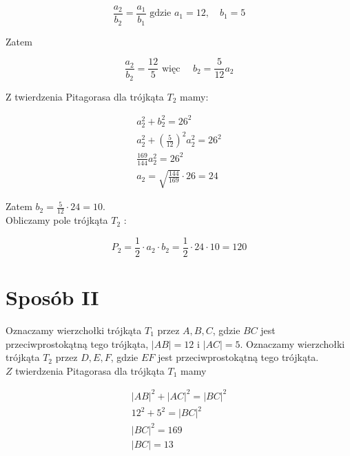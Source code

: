 \documentclass[10pt]{article}
\begin{document}
$$
\frac{a_{2}}{b_{2}}=\frac{a_{1}}{b_{1}} \text { gdzie } a_{1}=12, \quad b_{1}=5
$$

Zatem

$$
\frac{a_{2}}{b_{2}}=\frac{12}{5} \text { więc } \quad b_{2}=\frac{5}{12} a_{2}
$$

Z twierdzenia Pitagorasa dla trójkąta $T_{2}$ mamy:

$$
\begin{gathered}
a_{2}^{2}+b_{2}^{2}=26^{2} \\
a_{2}^{2}+\left(\frac{5}{12}\right)^{2} a_{2}^{2}=26^{2} \\
\frac{169}{144} a_{2}^{2}=26^{2} \\
a_{2}=\sqrt{\frac{144}{169}} \cdot 26=24
\end{gathered}
$$

Zatem $b_{2}=\frac{5}{12} \cdot 24=10$.\\
Obliczamy pole trójkąta $T_{2}$ :

$$
P_{2}=\frac{1}{2} \cdot a_{2} \cdot b_{2}=\frac{1}{2} \cdot 24 \cdot 10=120
$$

\section*{Sposób II}
Oznaczamy wierzchołki trójkąta $T_{1}$ przez $A, B, C$, gdzie $B C$ jest przeciwprostokątną tego trójkąta, $|A B|=12$ i $|A C|=5$. Oznaczamy wierzchołki trójkąta $T_{2}$ przez $D, E, F$, gdzie $E F$ jest przeciwprostokątną tego trójkąta.\\
$Z$ twierdzenia Pitagorasa dla trójkąta $T_{1}$ mamy

$$
\begin{gathered}
|A B|^{2}+|A C|^{2}=|B C|^{2} \\
12^{2}+5^{2}=|B C|^{2} \\
|B C|^{2}=169 \\
|B C|=13
\end{gathered}
$$
\end{document}
